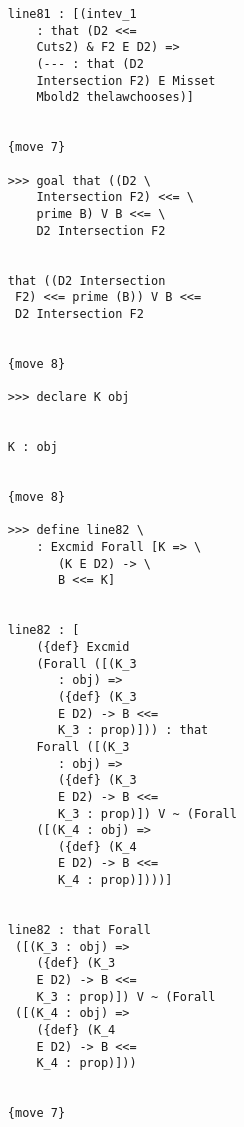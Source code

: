 \documentclass[12pt]{article}
\begin{document}
\begin{verbatim}
                        line81 : [(intev_1 
                            : that (D2 <<= 
                            Cuts2) & F2 E D2) => 
                            (--- : that (D2 
                            Intersection F2) E Misset 
                            Mbold2 thelawchooses)]


                        {move 7}

                        >>> goal that ((D2 \
                            Intersection F2) <<= \
                            prime B) V B <<= \
                            D2 Intersection F2


                        that ((D2 Intersection 
                         F2) <<= prime (B)) V B <<= 
                         D2 Intersection F2


                        {move 8}

                        >>> declare K obj


                        K : obj


                        {move 8}

                        >>> define line82 \
                            : Excmid Forall [K => \
                               (K E D2) -> \
                               B <<= K]


                        line82 : [
                            ({def} Excmid 
                            (Forall ([(K_3 
                               : obj) => 
                               ({def} (K_3 
                               E D2) -> B <<= 
                               K_3 : prop)])) : that 
                            Forall ([(K_3 
                               : obj) => 
                               ({def} (K_3 
                               E D2) -> B <<= 
                               K_3 : prop)]) V ~ (Forall 
                            ([(K_4 : obj) => 
                               ({def} (K_4 
                               E D2) -> B <<= 
                               K_4 : prop)])))]


                        line82 : that Forall 
                         ([(K_3 : obj) => 
                            ({def} (K_3 
                            E D2) -> B <<= 
                            K_3 : prop)]) V ~ (Forall 
                         ([(K_4 : obj) => 
                            ({def} (K_4 
                            E D2) -> B <<= 
                            K_4 : prop)]))


                        {move 7}


\end{verbatim}
\end{document}
